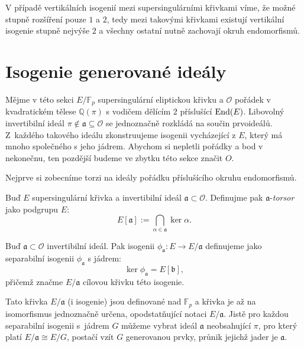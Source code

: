 \documentclass[12pt]{report}
\begin{document}
V případě vertikálních isogenií mezi supersingulárními křivkami víme, že možné stupně rozšíření pouze $1$ a $2$, tedy mezi takovými křivkami existují vertikální isogenie stupně nejvýše $2$ a všechny ostatní nutně zachovají okruh endomorfismů.

\section{Isogenie generované ideály}

Mějme v této sekci $E/\mathbb{F}_p$ supersingulární eliptickou křivku a $\mathcal{O}$ pořádek v kvadratickém tělese $\mathbb{Q}(\pi)$ s vodičem dělícím $2$ příslušící $\operatorname{End}(E)$. Libovolný invertibilní ideál $\pi \not\in \mathfrak{a} \subseteq \mathcal{O}$ se jednoznačně rozkládá na součin prvoideálů. Z~každého takového ideálu zkonstruujeme isogenii vycházející z $E$, který má mnoho společného s jeho jádrem. Abychom si nepletli pořádky a bod v nekonečnu, ten pozdější budeme ve zbytku této sekce značit $O$.

Nejprve si zobecníme torzi na ideály pořádku příslušícího okruhu endomorfismů.

\begin{definice}
Buď $E$ supersingulární křivka a invertibilní ideál $\mathfrak{a} \subset \mathcal{O}$.  Definujme pak $\mathfrak{a}$-\textit{torsor} jako podgrupu $E$:
\begin{equation*}
E[\mathfrak{a}] := \bigcap_{\alpha \in \mathfrak{a}} \ker \alpha.
\end{equation*}
\end{definice}

\begin{definice}
Buď $\mathfrak{a} \subset \mathcal{O}$ invertibilní ideál. Pak isogenii $\phi_{\mathfrak{a}} : E \longrightarrow E/\mathfrak{a}$ definujeme jako separabilní isogenii $\phi_{\mathfrak{a}}$ s jádrem:
\begin{equation*}
\ker \phi_{\mathfrak{a}} = E[\mathfrak{b}],
\end{equation*}
přičemž značme $E/\mathfrak{a}$ cílovou křivku této isogenie.
\end{definice}

Tato křivka $E/\mathfrak{a}$ (i isogenie) jsou definované nad $\mathbb{F}_p$ a křivka je až na isomorfismus jednoznačně určena, opodstatňující notaci $E/\mathfrak{a}$. Jistě pro každou separabilní isogenii s~jádrem $G$ můžeme vybrat ideál $\mathfrak{a}$ neobsahující $\pi$, pro který platí $E/\mathfrak{a} \cong E/G$, postačí vzít $G$ generovanou prvky, průnik jejichž jader je $\mathfrak{a}$. 
\end{document}
